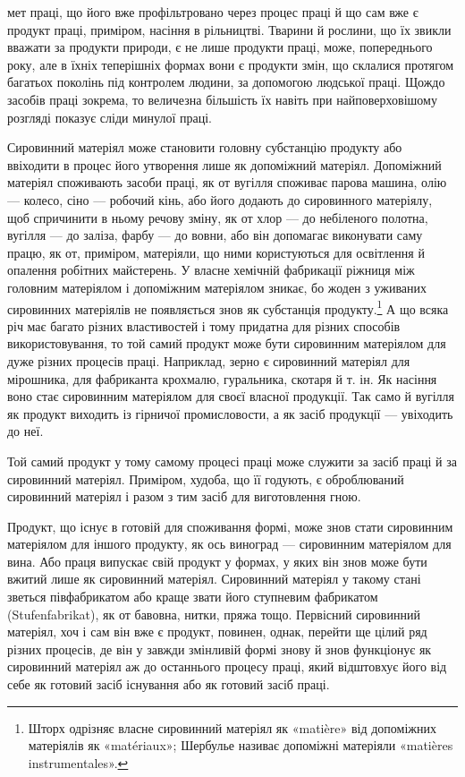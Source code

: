 мет праці, що його вже профільтровано через процес праці й що
сам вже є продукт праці, приміром, насіння в рільництві. Тварини
й рослини, що їх звикли вважати за продукти природи, є не
лише продукти праці, може, попереднього року, але в їхніх теперішніх
формах вони є продукти змін, що склалися протягом
багатьох поколінь під контролем людини, за допомогою людської
праці. Щождо засобів праці зокрема, то величезна більшість їх
навіть при найповерховішому розгляді показує сліди минулої
праці.

Сировинний матеріял може становити головну субстанцію
продукту або ввіходити в процес його утворення лише як допоміжний
матеріял. Допоміжний матеріял споживають засоби праці,
як от вугілля споживає парова машина, олію — колесо, сіно —
робочий кінь, або його додають до сировинного матеріялу, щоб
спричинити в ньому речову зміну, як от хлор — до небіленого
полотна, вугілля — до заліза, фарбу — до вовни, або він допомагає
виконувати саму працю, як от, приміром, матеріяли, що
ними користуються для освітлення й опалення робітних майстерень.
У власне хемічній фабрикації ріжниця між головним матеріялом
і допоміжним матеріялом зникає, бо жоден з уживаних
сировинних матеріялів не появляється знов як субстанція продукту.\footnote{
Шторх одрізняє власне сировинний матеріял як «matière» від
допоміжних матеріялів як «matériaux»; Шербулье називає допоміжні
матеріяли «matières instrumentales».
}
А що всяка річ має багато різних властивостей і тому придатна
для різних способів використовування, то той самий продукт
може бути сировинним матеріялом для дуже різних процесів
праці. Наприклад, зерно є сировинний матеріял для мірошника,
для фабриканта крохмалю, гуральника, скотаря й т. ін. Як
насіння воно стає сировинним матеріялом для своєї власної продукції.
Так само й вугілля як продукт виходить із гірничої промисловости,
а як засіб продукції — увіходить до неї.

Той самий продукт у тому самому процесі праці може служити
за засіб праці й за сировинний матеріял. Приміром, худоба,
що її годують, є оброблюваний сировинний матеріял і разом
з тим засіб для виготовлення гною.

Продукт, що існує в готовій для споживання формі, може знов
стати сировинним матеріялом для іншого продукту, як ось виноград
— сировинним матеріялом для вина. Або праця випускає
свій продукт у формах, у яких він знов може бути вжитий лише
як сировинний матеріял. Сировинний матеріял у такому стані
зветься півфабрикатом або краще звати його ступневим фабрикатом
(Stufenfabrikat), як от бавовна, нитки, пряжа тощо.
Первісний сировинний матеріял, хоч і сам він вже є продукт,
повинен, однак, перейти ще цілий ряд різних процесів, де він
у завжди змінливій формі знову й знов функціонує як сировинний
матеріял аж до останнього процесу праці, який відштовхує
його від себе як готовий засіб існування або як готовий засіб праці.